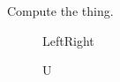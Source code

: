 \documentclass{article}
\begin{document}
\begin{algorithm}[t]
\hspace{1.5mm}Compute the thing.\;
\caption{A}
\end{algorithm}
\begin{figure}
Left\hspace{3em}\unskip Right
\caption{U}
\end{figure}
\end{document}
